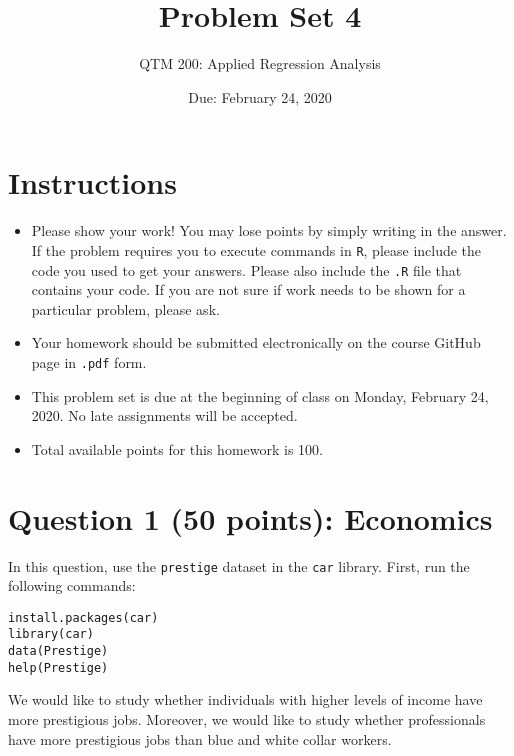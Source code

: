 \documentclass[12pt,letterpaper]{article}
\title{Problem Set 4}
\date{Due: February 24, 2020}
\author{QTM 200: Applied Regression Analysis}
\begin{document}
	\maketitle
	
	\section*{Instructions}
	\begin{itemize}
		\item Please show your work! You may lose points by simply writing in the answer. If the problem requires you to execute commands in \texttt{R}, please include the code you used to get your answers. Please also include the \texttt{.R} file that contains your code. If you are not sure if work needs to be shown for a particular problem, please ask.
		\item Your homework should be submitted electronically on the course GitHub page in \texttt{.pdf} form.
		\item This problem set is due at the beginning of class on Monday, February 24, 2020. No late assignments will be accepted.
		\item Total available points for this homework is 100.
	\end{itemize}

	\vspace{.5cm}
\section*{Question 1 (50 points): Economics}
\vspace{.25cm}
\noindent 	
In this question, use the \texttt{prestige} dataset in the \texttt{car} library. First, run the following commands:

\begin{verbatim}
install.packages(car)
library(car)
data(Prestige)
help(Prestige)
\end{verbatim} 


\noindent We would like to study whether individuals with higher levels of income have more prestigious jobs. Moreover, we would like to study whether professionals have more prestigious jobs than blue and white collar workers.
\end{document}
